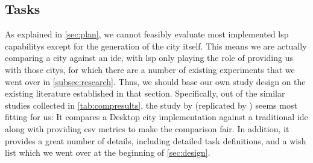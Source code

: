 \documentclass[../thesis]{subfiles}
\begin{document}
\subsection{Tasks}\label{subsec:tasks}
As explained in \cref{sec:plan}, we cannot feasibly evaluate most implemented \gls{lsp} \glspl{capability} except for the generation of the \gls{city} itself.
This means we are actually comparing a \gls{city} against an \gls{ide}, with \gls{lsp} only playing the role of providing us with those \glspl{city}, for which there are a number of existing experiments that we went over in \cref{subsec:research}.
Thus, we should base our own study design on the existing literature established in that section.
Specifically, out of the similar studies collected in \cref{tab:compresults}, the study by \textcites{wettel2011} (replicated by \textcite{romano2019}) seems most fitting for us:
It compares a Desktop \gls{city} implementation against a traditional \gls{ide} along with providing \gls{csv} metrics to make the comparison fair.
In addition, it provides a great number of details, including detailed task definitions, and a wish list which we went over at the beginning of \cref{sec:design}.
\end{document}
